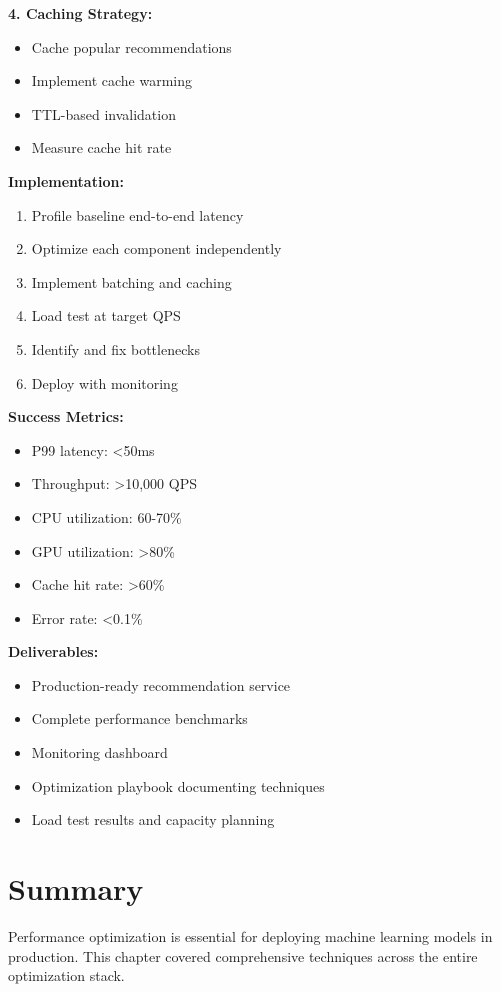 \textbf{4. Caching Strategy:}
\begin{itemize}
    \item Cache popular recommendations
    \item Implement cache warming
    \item TTL-based invalidation
    \item Measure cache hit rate
\end{itemize}

\textbf{Implementation:}
\begin{enumerate}
    \item Profile baseline end-to-end latency
    \item Optimize each component independently
    \item Implement batching and caching
    \item Load test at target QPS
    \item Identify and fix bottlenecks
    \item Deploy with monitoring
\end{enumerate}

\textbf{Success Metrics:}
\begin{itemize}
    \item P99 latency: <50ms
    \item Throughput: >10,000 QPS
    \item CPU utilization: 60-70\%
    \item GPU utilization: >80\%
    \item Cache hit rate: >60\%
    \item Error rate: <0.1\%
\end{itemize}

\textbf{Deliverables:}
\begin{itemize}
    \item Production-ready recommendation service
    \item Complete performance benchmarks
    \item Monitoring dashboard
    \item Optimization playbook documenting techniques
    \item Load test results and capacity planning
\end{itemize}

\section{Summary}

Performance optimization is essential for deploying machine learning models in production. This chapter covered comprehensive techniques across the entire optimization stack.

